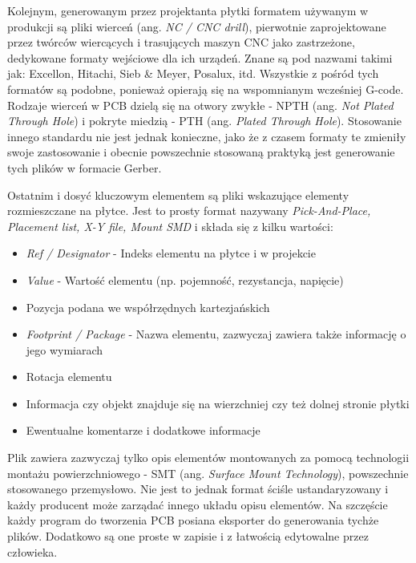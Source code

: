 \documentclass[brudnopis]{xmgr}
\begin{document}
Kolejnym, generowanym przez projektanta płytki formatem używanym w produkcji są pliki wierceń (ang. \emph{NC / CNC drill}), pierwotnie zaprojektowane przez twórców wiercących i trasujących maszyn CNC jako zastrzeżone, dedykowane formaty wejściowe dla ich urządeń. Znane są pod nazwami takimi jak: Excellon, Hitachi, Sieb \& Meyer, Posalux, itd.\cite{Charras} Wszystkie z pośród tych formatów są podobne, ponieważ opierają się na wspomnianym wcześniej G-code. Rodzaje wierceń w PCB dzielą się na otwory zwykłe - NPTH (ang. \emph{Not Plated Through Hole}) i pokryte miedzią - PTH (ang. \emph{Plated Through Hole}).\cite{voldman} Stosowanie innego standardu nie jest jednak konieczne, jako że z czasem formaty te zmieniły swoje zastosowanie i obecnie powszechnie stosowaną praktyką jest generowanie tych plików w formacie Gerber.

\newpage

Ostatnim i dosyć kluczowym elementem są pliki wskazujące elementy rozmieszczane na płytce. Jest to prosty format nazywany \emph {Pick-And-Place, Placement list, X-Y file, Mount SMD}  i składa się z kilku wartości:
\begin{itemize}
\item \emph{Ref / Designator} - Indeks elementu na płytce i w projekcie
\item \emph{Value} - Wartość elementu (np. pojemność, rezystancja, napięcie)
\item Pozycja podana we współrzędnych kartezjańskich
\item \emph{Footprint / Package} - Nazwa elementu, zazwyczaj zawiera także informację o jego wymiarach
\item Rotacja elementu
\item Informacja czy objekt znajduje się na wierzchniej czy też dolnej stronie płytki
\item Ewentualne komentarze i dodatkowe informacje
\end{itemize}
Plik zawiera zazwyczaj tylko opis elementów montowanych za pomocą technologii montażu powierzchniowego - SMT (ang. \emph{Surface Mount Technology}), powszechnie stosowanego przemysłowo. Nie jest to jednak format ściśle ustandaryzowany i każdy producent może zarządać innego układu opisu elementów.\cite {prasad} Na szczęście każdy program do tworzenia PCB posiana eksporter do generowania tychże plików. Dodatkowo są one proste w zapisie i z łatwością edytowalne przez człowieka.



\end{document}
